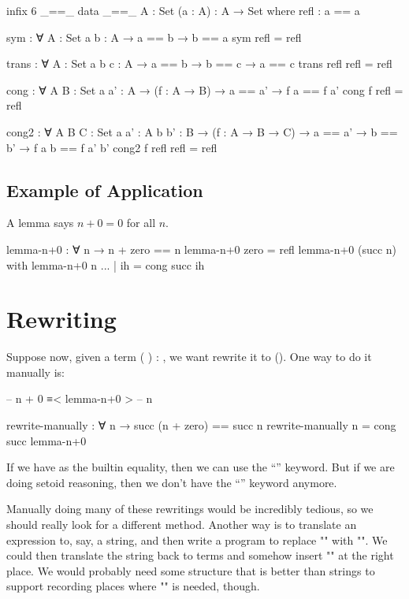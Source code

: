 \documentclass{article}
\begin{document}
\begin{code}
infix 6 _==_
data _==_ {A : Set} (a : A) : A → Set where
  refl : a == a

sym : ∀ {A : Set} {a b : A} → a == b → b == a
sym refl = refl

trans : ∀ {A : Set} {a b c : A} → a == b → b == c → a == c
trans refl refl = refl

cong : ∀ {A B : Set} {a a' : A} →
       (f : A → B) → a == a' → f a == f a'
cong f refl = refl

cong2 : ∀ {A B C : Set} {a a' : A} {b b' : B} →
        (f : A → B → C) → a == a' → b == b' → f a b == f a' b'
cong2 f refl refl = refl
\end{code}

\subsection{Example of Application}

A lemma says \(n + 0 = 0\) for all \(n\).

\begin{code}
lemma-n+0 : ∀ {n} → n + zero == n
lemma-n+0 {zero} = refl
lemma-n+0 {(succ n)} with lemma-n+0 {n}
... | ih = cong succ ih
\end{code}

\section{Rewriting}

Suppose now, given a term \AgdaSymbol( \AgdaOperator{\AgdaInductiveConstructor{+}} \AgdaSymbol) \AgdaSymbol: , we want rewrite it to \AgdaSymbol(\AgdaSymbol). One way to do it manually is:

\begin{code}
--  n + 0 ≡< lemma-n+0 >
--  n
\end{code}

\begin{code}
rewrite-manually : ∀ n → succ (n + zero) == succ n
rewrite-manually n = cong succ lemma-n+0
\end{code}

If we have \AgdaFunction{\AgdaUnderscore{}==\AgdaUnderscore{}} as the builtin equality, then we can use the ``'' keyword. But if we are doing setoid reasoning, then we don't have the ``'' keyword anymore.

Manually doing many of these rewritings would be incredibly tedious, so we should really look for a different method. Another way is to translate an expression to, say, a string, and then write a program to replace "" with "". We could then translate the string back to terms and somehow insert "" at the right place. We would probably need some structure that is better than strings to support recording places where "" is needed, though.
\end{document}
